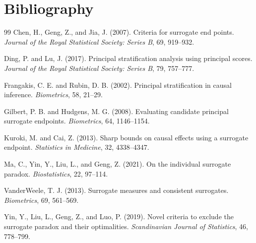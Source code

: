 \documentclass[11pt]{article}
\theoremstyle{definition}
\theoremstyle{plain}
\theoremstyle{remark}
\begin{document}
\section*{Bibliography}
\begin{thebibliography}{99}
Chen, H., Geng, Z., and Jia, J. (2007).
Criteria for surrogate end points.
\emph{Journal of the Royal Statistical Society: Series B}, 69, 919--932.

Ding, P. and Lu, J. (2017).
Principal stratification analysis using principal scores.
\emph{Journal of the Royal Statistical Society: Series B}, 79, 757--777.

Frangakis, C. E. and Rubin, D. B. (2002).
Principal stratification in causal inference.
\emph{Biometrics}, 58, 21--29.

Gilbert, P. B. and Hudgens, M. G. (2008).
Evaluating candidate principal surrogate endpoints.
\emph{Biometrics}, 64, 1146--1154.

Kuroki, M. and Cai, Z. (2013).
Sharp bounds on causal effects using a surrogate endpoint.
\emph{Statistics in Medicine}, 32, 4338--4347.

Ma, C., Yin, Y., Liu, L., and Geng, Z. (2021).
On the individual surrogate paradox.
\emph{Biostatistics}, 22, 97--114.

VanderWeele, T. J. (2013).
Surrogate measures and consistent surrogates.
\emph{Biometrics}, 69, 561--569.

Yin, Y., Liu, L., Geng, Z., and Luo, P. (2019).
Novel criteria to exclude the surrogate paradox and their optimalities.
\emph{Scandinavian Journal of Statistics}, 46, 778--799.
\end{thebibliography}
\end{document}
